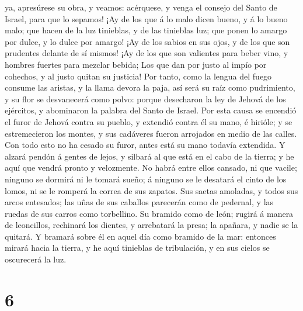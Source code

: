 ya, apresúrese su obra, y veamos: acérquese, y venga el consejo del
Santo de Israel, para que lo sepamos!  ¡Ay de los que á
lo malo dicen bueno, y á lo bueno malo; que hacen de la luz tinieblas, y
de las tinieblas luz; que ponen lo amargo por dulce, y lo dulce por
amargo!  ¡Ay de los sabios en sus ojos, y de los que son
prudentes delante de sí mismos!  ¡Ay de los que son
valientes para beber vino, y hombres fuertes para mezclar bebida;
 Los que dan por justo al impío por cohechos, y al justo
quitan su justicia!  Por tanto, como la lengua del fuego
consume las aristas, y la llama devora la paja, así será su raíz como
pudrimiento, y su flor se desvanecerá como polvo: porque desecharon la
ley de Jehová de los ejércitos, y abominaron la palabra del Santo de
Israel.  Por esta causa se encendió el furor de Jehová
contra su pueblo, y extendió contra él su mano, é hirióle; y se
estremecieron los montes, y sus cadáveres fueron arrojados en medio de
las calles. Con todo esto no ha cesado su furor, antes está su mano
todavía extendida.  Y alzará pendón á gentes de lejos, y
silbará al que está en el cabo de la tierra; y he aquí que vendrá pronto
y velozmente.  No habrá entre ellos cansado, ni que
vacile; ninguno se dormirá ni le tomará sueño; á ninguno se le desatará
el cinto de los lomos, ni se le romperá la correa de sus zapatos.
 Sus saetas amoladas, y todos sus arcos entesados; las
uñas de sus caballos parecerán como de pedernal, y las ruedas de sus
carros como torbellino.  Su bramido como de león; rugirá
á manera de leoncillos, rechinará los dientes, y arrebatará la presa; la
apañara, y nadie se la quitará.  Y bramará sobre él en
aquel día como bramido de la mar: entonces mirará hacia la tierra, y he
aquí tinieblas de tribulación, y en sus cielos se oscurecerá la luz.

\hypertarget{section-5}{%
\section{6}\label{section-5}}

